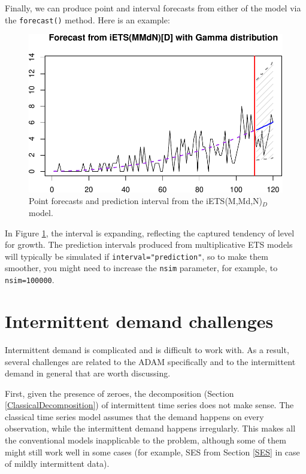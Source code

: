 \documentclass[
]{book}
\theoremstyle{definition}
\theoremstyle{definition}
\theoremstyle{definition}
\theoremstyle{definition}
\theoremstyle{remark}
\begin{document}
Finally, we can produce point and interval forecasts from either of the model via the \texttt{forecast()} method. Here is an example:

\begin{figure}
\centering
\includegraphics{Svetunkov--2022----ADAM_files/figure-latex/adamiETSyForecasts-1.pdf}
\caption{\label{fig:adamiETSyForecasts}Point forecasts and prediction interval from the iETS(M,Md,N)\(_D\) model.}
\end{figure}

In Figure \ref{fig:adamiETSyForecasts}, the interval is expanding, reflecting the captured tendency of level for growth. The prediction intervals produced from multiplicative ETS models will typically be simulated if \texttt{interval="prediction"}, so to make them smoother, you might need to increase the \texttt{nsim} parameter, for example, to \texttt{nsim=100000}.

\hypertarget{intermittent-demand-challenges}{%
\section{Intermittent demand challenges}\label{intermittent-demand-challenges}}

Intermittent demand is complicated and is difficult to work with. As a result, several challenges are related to the ADAM specifically and to the intermittent demand in general that are worth discussing.

First, given the presence of zeroes, the decomposition (Section \ref{ClassicalDecomposition}) of intermittent time series does not make sense. The classical time series model assumes that the demand happens on every observation, while the intermittent demand happens irregularly. This makes all the conventional models inapplicable to the problem, although some of them might still work well in some cases (for example, SES from Section \ref{SES} in case of mildly intermittent data).
\end{document}
